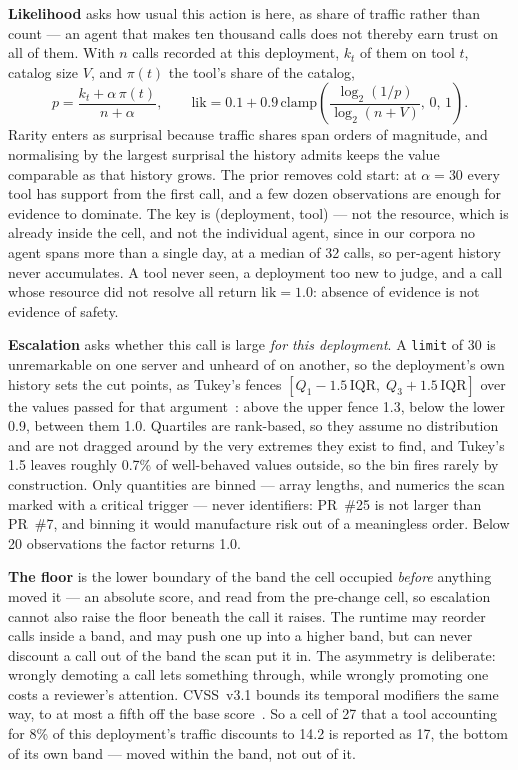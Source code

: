 \documentclass[sigconf]{acmart}
\begin{document}
\textbf{Likelihood} asks how usual this action is here, as share of traffic
rather than count --- an agent that makes ten thousand calls does not thereby
earn trust on all of them. With $n$ calls recorded at this deployment, $k_t$ of
them on tool $t$, catalog size $V$, and $\pi(t)$ the tool's share of the
catalog,
\begin{equation}
p = \frac{k_{t} + \alpha\,\pi(t)}{n + \alpha}, \qquad
\mathrm{lik} = 0.1 + 0.9\,
  \mathrm{clamp}\!\left(\frac{\log_2 (1/p)}{\log_2 (n+V)},\, 0,\, 1\right).
\label{eq:lik}
\end{equation}
Rarity enters as surprisal because traffic shares span orders of magnitude, and
normalising by the largest surprisal the history admits keeps the value
comparable as that history grows. The prior removes cold start: at $\alpha =
30$ every tool has support from the first call, and a few dozen observations
are enough for evidence to dominate. The key is (deployment, tool) --- not the
resource, which is already inside the cell, and not the individual agent, since
in our corpora no agent spans more than a single day, at a median of 32 calls,
so per-agent history never accumulates. A tool never seen, a deployment too new
to judge, and a call whose resource did not resolve all return $\mathrm{lik} =
1.0$: absence of evidence is not evidence of safety.

\textbf{Escalation} asks whether this call is large \emph{for this deployment}.
A \texttt{limit} of 30 is unremarkable on one server and unheard of on another,
so the deployment's own history sets the cut points, as Tukey's fences $[Q_1 -
1.5\,\mathrm{IQR},\; Q_3 + 1.5\,\mathrm{IQR}]$ over the values passed for that
argument~\cite{tukey1977eda}: above the upper fence 1.3, below the lower 0.9,
between them 1.0. Quartiles are rank-based, so they assume no distribution and
are not dragged around by the very extremes they exist to find, and Tukey's 1.5
leaves roughly 0.7\% of well-behaved values outside, so the bin fires rarely by
construction. Only quantities are binned --- array lengths, and numerics the
scan marked with a critical trigger --- never identifiers: PR~\#25 is not
larger than PR~\#7, and binning it would manufacture risk out of a meaningless
order. Below 20 observations the factor returns 1.0.

\textbf{The floor} is the lower boundary of the band the cell occupied
\emph{before} anything moved it --- an absolute score, and read from the
pre-change cell, so escalation cannot also raise the floor beneath the call it
raises. The runtime may reorder calls inside a band, and may push one up into a
higher band, but can never discount a call out of the band the scan put it in.
The asymmetry is deliberate: wrongly demoting a call lets something through,
while wrongly promoting one costs a reviewer's attention. CVSS~v3.1 bounds its
temporal modifiers the same way, to at most a fifth off the base
score~\cite{first2019cvss31}. So a cell of 27 that a tool accounting for 8\% of
this deployment's traffic discounts to 14.2 is reported as 17, the bottom of
its own band --- moved within the band, not out of it.
\end{document}
